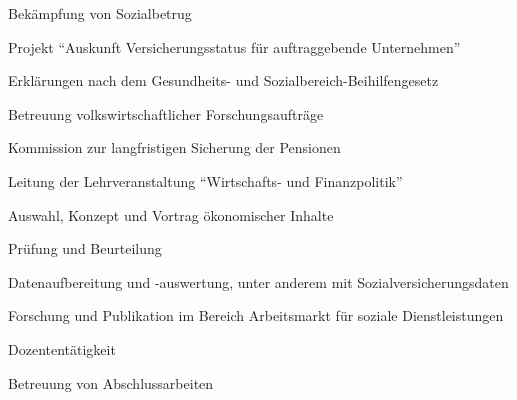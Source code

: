 
{\begin{cvenumerate}
		\item Bekämpfung von Sozialbetrug
		\item Projekt "`Auskunft Versicherungsstatus für auftraggebende Unternehmen"'
		\item Erklärungen nach dem Gesundheits- und Sozialbereich-Beihilfengesetz
		\item Betreuung volkswirtschaftlicher Forschungsaufträge
		\item Kommission zur langfristigen Sicherung der Pensionen
	\end{cvenumerate}}

{\begin{cvenumerate}
		\item Leitung der Lehrveranstaltung "`Wirtschafts- und Finanzpolitik"'
		\item Auswahl, Konzept und Vortrag ökonomischer Inhalte
		\item Prüfung und Beurteilung
	\end{cvenumerate}}

	{\begin{cvenumerate}
		\item Datenaufbereitung und -auswertung, unter anderem mit Sozialversicherungsdaten
		\item Forschung und Publikation im Bereich Arbeitsmarkt für soziale Dienstleistungen
		\item Dozententätigkeit
		\item Betreuung von Abschlussarbeiten
	\end{cvenumerate}}

